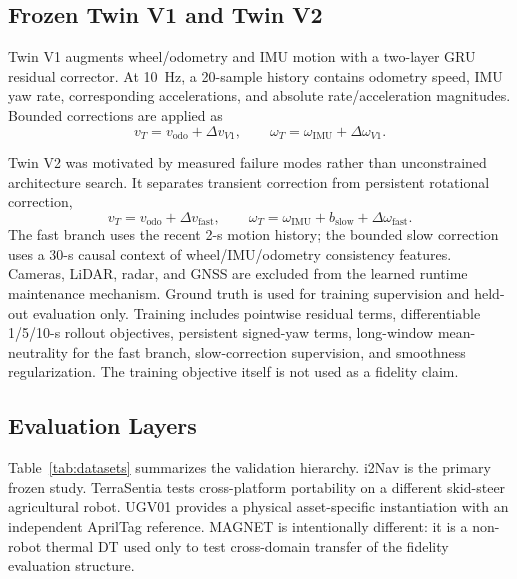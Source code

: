 \documentclass[journal]{IEEEtran}
\begin{document}
\subsection{Frozen Twin V1 and Twin V2}
Twin V1 augments wheel/odometry and IMU motion with a two-layer GRU residual corrector. At 10~Hz, a 20-sample history contains odometry speed, IMU yaw rate, corresponding accelerations, and absolute rate/acceleration magnitudes. Bounded corrections are applied as
\begin{equation}
v_T=v_{\mathrm{odo}}+\Delta v_{V1},\qquad
\omega_T=\omega_{\mathrm{IMU}}+\Delta\omega_{V1}.
\end{equation}

Twin V2 was motivated by measured failure modes rather than unconstrained architecture search. It separates transient correction from persistent rotational correction,
\begin{equation}
v_T=v_{\mathrm{odo}}+\Delta v_{\mathrm{fast}},\qquad
\omega_T=\omega_{\mathrm{IMU}}+b_{\mathrm{slow}}+\Delta\omega_{\mathrm{fast}}.
\end{equation}
The fast branch uses the recent 2-s motion history; the bounded slow correction uses a 30-s causal context of wheel/IMU/odometry consistency features. Cameras, LiDAR, radar, and GNSS are excluded from the learned runtime maintenance mechanism. Ground truth is used for training supervision and held-out evaluation only. Training includes pointwise residual terms, differentiable 1/5/10-s rollout objectives, persistent signed-yaw terms, long-window mean-neutrality for the fast branch, slow-correction supervision, and smoothness regularization. The training objective itself is not used as a fidelity claim.

\subsection{Evaluation Layers}
Table~\ref{tab:datasets} summarizes the validation hierarchy. i2Nav is the primary frozen study. TerraSentia tests cross-platform portability on a different skid-steer agricultural robot. UGV01 provides a physical asset-specific instantiation with an independent AprilTag reference. MAGNET is intentionally different: it is a non-robot thermal DT used only to test cross-domain transfer of the fidelity evaluation structure.
\end{document}
